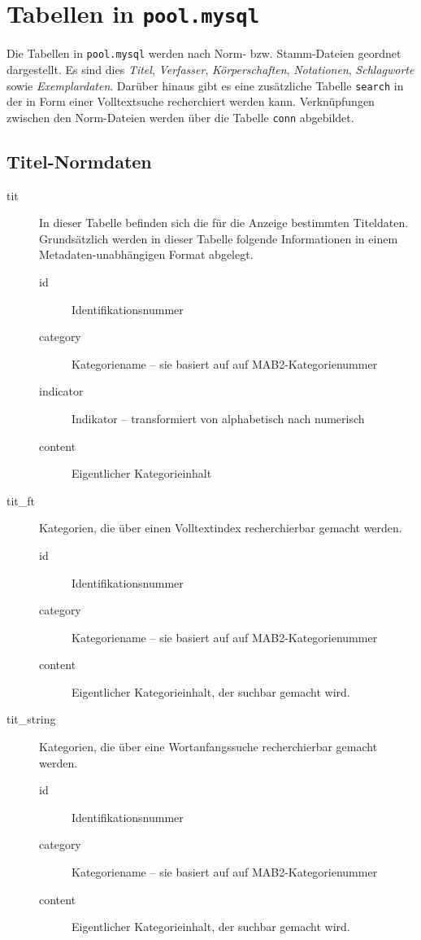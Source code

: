 \documentclass[11pt, twoside, a4paper, BCOR8mm, DIV12, bibtotoc,idxtotoc]{scrbook}
\begin{document}
\chapter{Tabellen in \texttt{pool.mysql}}

Die Tabellen in \texttt{pool.mysql} werden nach Norm- bzw.
Stamm-Dateien geordnet dargestellt. Es sind dies \emph{Titel},
\emph{Verfasser}, \emph{Körperschaften}, \emph{Notationen},
\emph{Schlagworte} sowie \emph{Exemplardaten}. Darüber hinaus gibt es eine zusätzliche
Tabelle \texttt{search} in der in Form einer Volltextsuche
recherchiert werden kann. Verknüpfungen zwischen den Norm-Dateien
werden über die Tabelle \texttt{conn} abgebildet.

\section{Titel-Normdaten}

\begin{description}
\item[tit] In dieser Tabelle befinden sich die für die Anzeige
  bestimmten Titeldaten. Grundsätzlich werden in dieser Tabelle
  folgende Informationen in einem Metadaten-unabhängigen Format
  abgelegt.
  \begin{description}
  \item[id] Identifikationsnummer
  \item[category] Kategoriename -- sie basiert auf auf MAB2-Kategorienummer
  \item[indicator] Indikator -- transformiert von alphabetisch nach numerisch
  \item[content] Eigentlicher Kategorieinhalt
  \end{description}
\item[tit\_ft] Kategorien, die über einen Volltextindex recherchierbar
  gemacht werden.
  \begin{description}
  \item[id] Identifikationsnummer
  \item[category] Kategoriename -- sie basiert auf auf MAB2-Kategorienummer
  \item[content] Eigentlicher Kategorieinhalt, der suchbar gemacht wird.
  \end{description}
\item[tit\_string] Kategorien, die über eine Wortanfangssuche
  recherchierbar gemacht werden.
  \begin{description}
  \item[id] Identifikationsnummer
  \item[category] Kategoriename -- sie basiert auf auf MAB2-Kategorienummer
  \item[content] Eigentlicher Kategorieinhalt, der suchbar gemacht wird.
  \end{description}
\end{description}
\end{document}
